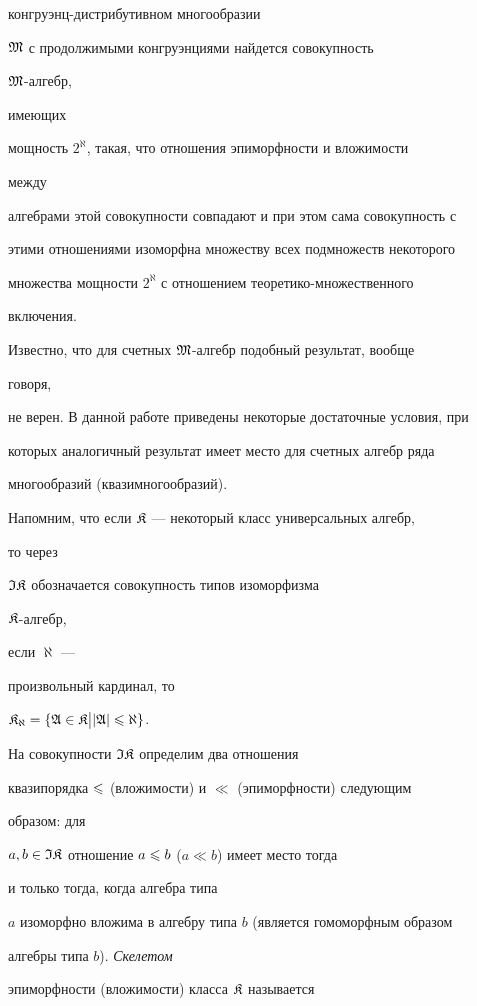 конгруэнц-дистрибутивном многообразии


$\frak M$ с продолжимыми конгруэнциями найдется совокупность


$\frak M$-алгебр,


имеющих


мощность $2^{\aleph}$, такая, что отношения эпиморфности и вложимости


между


алгебрами этой совокупности совпадают и при этом сама совокупность с


этими отношениями изоморфна множеству всех подмножеств некоторого


множества мощности $2^{\aleph}$ с отношением теоретико-множественного


включения.


Известно, что для счетных $\frak M$-алгебр подобный результат, вообще


говоря,


не верен. В данной работе приведены некоторые достаточные условия, при


которых аналогичный результат имеет место для счетных алгебр ряда


многообразий (квазимногообразий).





Напомним, что если $\frak K$ --- некоторый класс универсальных алгебр,


то через


$\frak I\frak K$ обозначается совокупность типов изоморфизма


$\frak K$-алгебр,


если $\aleph$ ---


произвольный кардинал, то


$\frak K_{\aleph}=\{\frak A\in\frak K\bigr|\bigl.|\frak A|\leqslant\aleph\}$.


На совокупности $\frak I\frak K$ определим два отношения


квазипорядка $\leqslant$ (вложимости) и $\ll$ (эпиморфности) следующим


образом: для


$a,b\in\frak I\frak K$ отношение $a\leqslant b$ ($a\ll b$) имеет место тогда


и только тогда, когда алгебра типа


$a$ изоморфно вложима в алгебру типа $b$ (является гомоморфным образом


алгебры типа $b$). {\it Скелетом}


эпиморфности (вложимости) класса $\frak K$ называется


